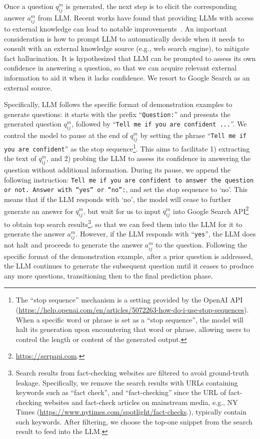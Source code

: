 \documentclass[11pt]{article}
\begin{document}
Once a question $q_{ij}^m$ is generated, the next step is to elicit the corresponding answer $a_{ij}^m$ from LLM. Recent works have found that providing LLMs with access to external knowledge can lead to notable improvements~\cite{yao2023react,jiang2023active}. An important consideration is how to prompt LLM to automatically decide when it needs to consult with an external knowledge source (e.g., web search engine), to mitigate fact hallucination. It is hypothesized that LLM can be prompted to assess its own confidence in answering a question, so that we can acquire relevant external information to aid it when it lacks confidence. We resort to Google Search as an external source. 

Specifically, LLM follows the specific format of demonstration examples to generate questions: it starts with the prefix ``\texttt{Question:}'' and presents the generated question $q_{ij}^m$, followed by ``\texttt{Tell me if you are confident ...}''. We control the model to pause at the end of $q_{ij}^m$ by setting the phrase ``\texttt{Tell me if you are confident}'' as the stop sequence\footnote{The ``stop sequence'' mechanism is a setting provided by the OpenAI API (\url{https://help.openai.com/en/articles/5072263-how-do-i-use-stop-sequences}). When a specific word or phrase is set as a ``stop sequence'', the model will halt its generation upon encountering that word or phrase, allowing users to control the length or content of the generated output. }. This aims to facilitate 1) extracting the text of $q_{ij}^m$, and 2) probing the LLM to assess its confidence in answering the question without additional information. During its pause, we append the following instruction: 
\texttt{Tell me if you are confident to answer the question or not. Answer with ``yes'' or ``no'':}, and set the stop sequence to `no'. This means that if the LLM responds with `no', the model will cease to further generate an answer for $q^m_{ij}$, but wait for us to input $q_{ij}^m$ into Google Search API\footnote{\url{https://serpapi.com}.} to obtain top search results\footnote{Search results from fact-checking websites are filtered to avoid ground-truth leakage. Specifically, we remove the search results with URLs containing keywords such as ``fact check'', and ``fact-checking'' since the URL of fact-checking websites and fact-check articles on mainstream media, e.g., NY Times (\url{https://www.nytimes.com/spotlight/fact-checks}.), typically contain such keywords. After filtering, we choose the top-one snippet from the search result to feed into the LLM.}, so that we can feed them into the LLM for it to generate the answer $a_{ij}^m$. 
However, if the LLM responds with ``\texttt{yes}'', the LLM does not halt and proceeds to generate the answer $a_{ij}^m$ to the question. Following the specific format of the demonstration example, after a prior question is addressed, the LLM continues to generate the subsequent question until it ceases to produce any more questions, transitioning then to the final prediction phase.
\end{document}
